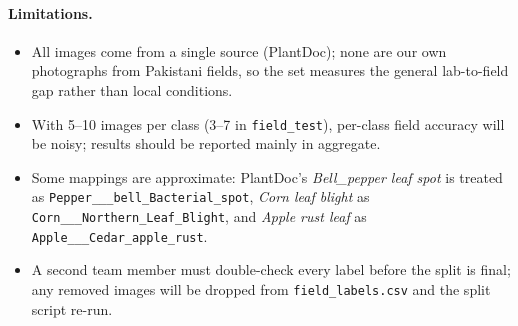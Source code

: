 \paragraph{Limitations.}
\begin{itemize}
    \item All images come from a single source (PlantDoc); none are our own photographs from Pakistani fields, so the set measures the general lab-to-field gap rather than local conditions.
    \item With 5--10 images per class (3--7 in \texttt{field\_test}), per-class field accuracy will be noisy; results should be reported mainly in aggregate.
    \item Some mappings are approximate: PlantDoc's \textit{Bell\_pepper leaf spot} is treated as \texttt{Pepper\_\_\_bell\_Bacterial\_spot}, \textit{Corn leaf blight} as \texttt{Corn\_\_\_Northern\_Leaf\_Blight}, and \textit{Apple rust leaf} as \texttt{Apple\_\_\_Cedar\_apple\_rust}.
    \item A second team member must double-check every label before the split is final; any removed images will be dropped from \texttt{field\_labels.csv} and the split script re-run.
\end{itemize}
